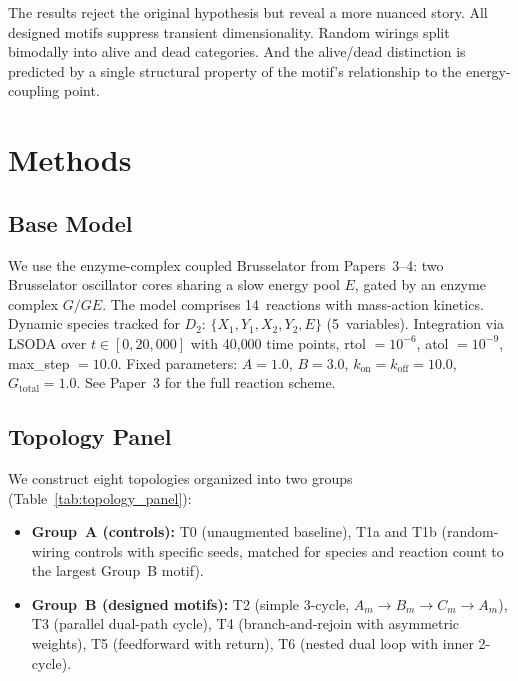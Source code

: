\documentclass[twocolumn,showpacs,preprintnumbers,amsmath,amssymb,prd,floatfix]{revtex4-2}
\newcommand{\Dtwo}{D_2}
\newcommand{\Gtot}{G_{\mathrm{total}}}
\begin{document}
The results reject the original hypothesis but reveal a more nuanced story. All designed motifs suppress transient dimensionality. Random wirings split bimodally into alive and dead categories. And the alive/dead distinction is predicted by a single structural property of the motif's relationship to the energy-coupling point.

\section{Methods}
\label{sec:methods}

\subsection{Base Model}

We use the enzyme-complex coupled Brusselator from Papers~3--4: two Brusselator oscillator cores sharing a slow energy pool $E$, gated by an enzyme complex $G/GE$. The model comprises 14~reactions with mass-action kinetics. Dynamic species tracked for $\Dtwo$: $\{X_1, Y_1, X_2, Y_2, E\}$ (5~variables). Integration via LSODA over $t \in [0, 20{,}000]$ with 40{,}000 time points, rtol $= 10^{-6}$, atol $= 10^{-9}$, max\_step $= 10.0$. Fixed parameters: $A = 1.0$, $B = 3.0$, $k_\text{on} = k_\text{off} = 10.0$, $\Gtot = 1.0$. See Paper~3 for the full reaction scheme.

\subsection{Topology Panel}

We construct eight topologies organized into two groups (Table~\ref{tab:topology_panel}):

\begin{itemize}
\item \textbf{Group~A (controls):} T0 (unaugmented baseline), T1a and T1b (random-wiring controls with specific seeds, matched for species and reaction count to the largest Group~B motif).

\item \textbf{Group~B (designed motifs):} T2 (simple 3-cycle, $A_m \to B_m \to C_m \to A_m$), T3 (parallel dual-path cycle), T4 (branch-and-rejoin with asymmetric weights), T5 (feedforward with return), T6 (nested dual loop with inner 2-cycle).
\end{itemize}
\end{document}
